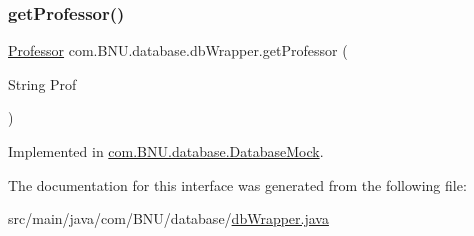 \mbox{\label{interfacecom_1_1_b_n_u_1_1database_1_1db_wrapper_a59b21a9c8d9f8ad2c2d723bfca5952af}} 
\subsubsection{\texorpdfstring{get\+Professor()}{getProfessor()}}
{\footnotesize\ttfamily \mbox{\hyperlink{classcom_1_1_b_n_u_1_1pages_1_1teachers_by_class_1_1_professor}{Professor}} com.\+B\+N\+U.\+database.\+db\+Wrapper.\+get\+Professor (\begin{DoxyParamCaption}\item[{String}]{Prof }\end{DoxyParamCaption})}



Implemented in \mbox{\hyperlink{classcom_1_1_b_n_u_1_1database_1_1_database_mock_a50b0d167f6a5be892b288dd8b34b241a}{com.\+B\+N\+U.\+database.\+Database\+Mock}}.



The documentation for this interface was generated from the following file\+:\begin{DoxyCompactItemize}
\item 
src/main/java/com/\+B\+N\+U/database/\mbox{\hyperlink{db_wrapper_8java}{db\+Wrapper.\+java}}\end{DoxyCompactItemize}
